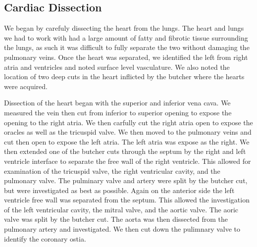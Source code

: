 \documentclass[12pt]{article}
\begin{document}
\subsection{Cardiac Dissection}
\par{}
We began by carefuly dissecting the heart from the lungs. The heart and lungs we had to work with had a large amount of fatty and fibrotic tissue surrounding the lungs, as such it was difficult to fully separate the two without damaging the pulmonary veins. Once the heart was separated, we identified the left from right atria and ventricles and noted surface level vasculature. We also noted the location of two deep cuts in the heart inflicted by the butcher where the hearts were acquired.
\par{}
Dissection of the heart began with the superior and inferior vena cava. We measured the vein then cut from inferior to superior opening to expose the opening to the right atria. We then carfully cut the right atria open to expose the oracles as well as the tricuspid valve. We then moved to the pulmonary veins and cut then open to expose the left atria. The left atria was expose as the right. We then extended one of the butcher cuts through the septum by the right and left ventricle interface to separate the free wall of the right ventricle. This allowed for examination of the tricuspid valve, the right ventricular cavity, and the pulmonary valve. The pulminary valve and artery were split by the butcher cut, but were investigated as best as possible. Again on the anterior side the left ventricle free wall was separated from the septum. This allowed the investigation of the left ventricular cavity, the mitral valve, and the aortic valve. The aoric valve was split by the butcher cut. The aorta was then dissected from the pulmonary artery and investigated. We then cut down the pulimnary valve to identify the coronary ostia.
\end{document}
